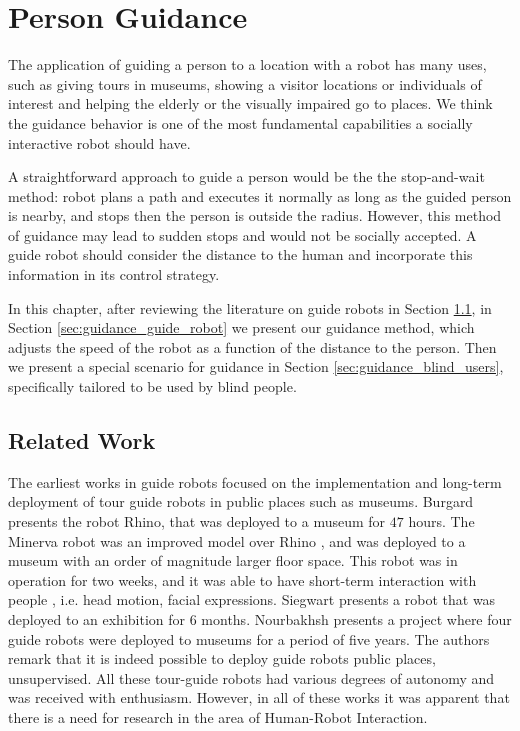 \chapter{Person Guidance}
\label{chapter:person_guidance}

The application of guiding a person to a location with a robot has many uses, such as giving tours in museums, showing a visitor locations or individuals of interest and helping the elderly or the visually impaired go to places. We think the guidance behavior is one of the most fundamental capabilities a socially interactive robot should have.

A straightforward approach to guide a person would be the the stop-and-wait method: robot plans a path and executes it normally as long as the guided person is nearby, and stops then the person is outside the radius. However, this method of guidance may lead to sudden stops and would not be socially accepted. A guide robot should consider the distance to the human and incorporate this information in its control strategy.

In this chapter, after reviewing the literature on guide robots in Section \ref{sec:guidance_related_work}, in Section \ref{sec:guidance_guide_robot} we present our guidance method, which adjusts the speed of the robot as a function of the distance to the person. Then we present a special scenario for guidance in Section \ref{sec:guidance_blind_users}, specifically tailored to be used by blind people.

\section{Related Work}
\label{sec:guidance_related_work}

The earliest works in guide robots focused on the implementation and long-term deployment of tour guide robots in public places such as museums. Burgard \cite{burgard1998interactive} presents the robot Rhino, that was deployed to a museum for $47$ hours. The Minerva robot was an improved model over Rhino \cite{thrun1999minerva}, and was deployed to a museum with an order of magnitude larger floor space. This robot was in operation for two weeks, and it was able to have short-term interaction with people , i.e. head motion, facial expressions. Siegwart \cite{siegwart2003robox} presents a robot that was deployed to an exhibition for 6 months. Nourbakhsh \cite{nourbakhsh2003mobot} presents a project where four guide robots were deployed to museums for a period of five years. The authors remark that it is indeed possible to deploy guide robots public places, unsupervised. All these tour-guide robots had various degrees of autonomy and was received with enthusiasm. However, in all of these works it was apparent that there is a need for research in the area of Human-Robot Interaction.

